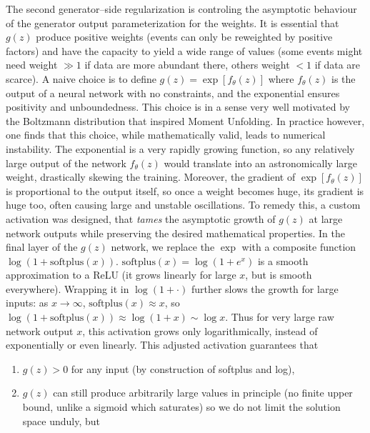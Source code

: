 {{            The second generator--side regularization is controling the asymptotic behaviour of the {generator output parameterization} for the weights.
            It is essential that $g(z)$ produce positive weights (events can only be reweighted by positive factors) and have the capacity to yield a wide range of values (some events might need weight $\gg 1$ if data are more abundant there, others weight $<1$ if data are scarce). 
            A naive choice is to define $g(z) = \exp[f_\theta(z)]$ where $f_\theta(z)$ is the output of a neural network with no constraints, and the exponential ensures positivity and unboundedness.
            This choice is in a sense very well motivated by the Boltzmann distribution that inspired Moment Unfolding.
            In practice however, one finds that this choice, while mathematically valid, leads to numerical instability.
            The exponential is a very rapidly growing function, so any relatively large output of the network $f_\theta(z)$ would translate into an astronomically large weight, drastically skewing the training.
            Moreover, the gradient of $\exp[f_\theta(z)]$ is proportional to the output itself, so once a weight becomes huge, its gradient is huge too, often causing large and unstable oscillations.
            To remedy this, a custom activation was designed, that \emph{tames} the asymptotic growth of $g(z)$ at large network outputs while preserving the desired mathematical properties.
            In the final layer of the $g(z)$ network, we replace the $\exp$ with a composite function $\log(1 + \mathrm{softplus}(x))$.
            $\mathrm{softplus}(x) = \log(1+e^x)$ is a smooth approximation to a ReLU (it grows linearly for large $x$, but is smooth everywhere).
            Wrapping it in $\log(1+\cdot)$ further slows the growth for large inputs: as $x \to \infty$, $\mathrm{softplus}(x)\approx x$, so $\log(1+\mathrm{softplus}(x)) \approx \log(1+x) \sim \log x$.
            Thus for very large raw network output $x$, this activation grows only logarithmically, instead of exponentially or even linearly.
            This adjusted activation guarantees that
            \begin{enumerate}
                \item $g(z) > 0$ for any input (by construction of softplus and log),
                \item \(g(z)\) can still produce arbitrarily large values in principle (no finite upper bound, unlike a sigmoid which saturates) so we do not limit the solution space unduly, but

\end{enumerate}}}
